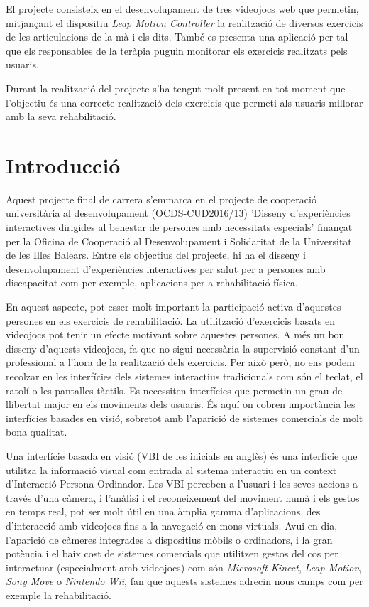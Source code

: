 \documentclass[12pt,a4paper,catalan]{article}
\begin{document}
	El projecte consisteix en el desenvolupament de tres videojocs web que permetin, mitjançant el dispositiu \textit{Leap Motion Controller} la realització de diversos exercicis de les articulacions de la mà i els dits. També es presenta una aplicació per tal que els responsables de la teràpia puguin monitorar els exercicis realitzats pels usuaris.
	
	Durant la realització del projecte s'ha tengut molt present en tot moment que l'objectiu és una correcte realització dels exercicis que permeti als usuaris millorar amb la seva rehabilitació.
	\newpage
	\section{Introducció}
	Aquest projecte final de carrera s'emmarca en el projecte de cooperació universitària al desenvolupament (OCDS-CUD2016/13) 'Disseny d'experiències interactives dirigides al benestar de persones amb necessitats especials' finançat per la Oficina de Cooperació al Desenvolupament i Solidaritat  de la Universitat de les Illes Balears. Entre els objectius del projecte, hi ha el disseny i desenvolupament d'experiències interactives per salut per a persones amb discapacitat com per exemple, aplicacions per a rehabilitació física. 
	
	En aquest aspecte, pot esser molt important la participació activa d'aquestes persones en els exercicis de rehabilitació. La utilització d'exercicis basats en videojocs pot tenir un efecte motivant sobre aquestes persones. A més un bon disseny d'aquests videojocs, fa que no sigui necessària la supervisió constant d'un professional a l'hora de la realització dels exercicis.
	Per això però, no ens podem recolzar en les interfícies dels sistemes interactius tradicionals com són el teclat, el ratolí o les pantalles tàctils. Es necessiten interfícies que permetin un grau de llibertat major en els moviments dels usuaris. És aquí on cobren importància les interfícies basades en visió, sobretot amb l'aparició de sistemes comercials de molt bona qualitat.
	
	Una interfície basada en visió (VBI de les inicials en anglès) és una interfície que utilitza la informació visual com entrada al sistema interactiu en un context d'Interacció Persona Ordinador. 
	Les VBI perceben a  l'usuari i les seves accions a través d'una càmera, i l'anàlisi i el reconeixement del moviment humà i els gestos en temps real, pot ser molt útil en una àmplia gamma d'aplicacions, des d'interacció amb videojocs fins a la navegació en mons virtuals.
	Avui en dia, l'aparició de càmeres integrades a dispositius mòbils o ordinadors, i la gran potència i el baix cost de sistemes comercials que utilitzen gestos del cos per interactuar (especialment amb videojocs) com són \textit{Microsoft Kinect}, \textit{Leap Motion}, \textit{Sony Move} o \textit{Nintendo Wii}, fan que aquests sistemes adrecin nous camps com per exemple la rehabilitació.
\end{document}
